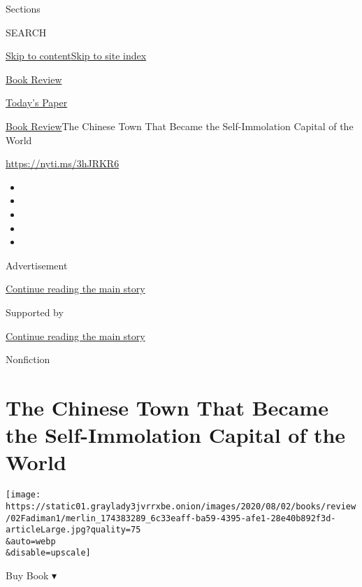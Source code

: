 Sections

SEARCH

\protect\hyperlink{site-content}{Skip to
content}\protect\hyperlink{site-index}{Skip to site index}

\href{https://www.nytimes3xbfgragh.onion/section/books/review}{Book
Review}

\href{https://myaccount.nytimes3xbfgragh.onion/auth/login?response_type=cookie\&client_id=vi}{}

\href{https://www.nytimes3xbfgragh.onion/section/todayspaper}{Today's
Paper}

\href{/section/books/review}{Book Review}\textbar{}The Chinese Town That
Became the Self-Immolation Capital of the World

\href{https://nyti.ms/3hJRKR6}{https://nyti.ms/3hJRKR6}

\begin{itemize}
\item
\item
\item
\item
\item
\end{itemize}

Advertisement

\protect\hyperlink{after-top}{Continue reading the main story}

Supported by

\protect\hyperlink{after-sponsor}{Continue reading the main story}

Nonfiction

\hypertarget{the-chinese-town-that-became-the-self-immolation-capital-of-the-world}{%
\section{The Chinese Town That Became the Self-Immolation Capital of the
World}\label{the-chinese-town-that-became-the-self-immolation-capital-of-the-world}}

\texttt{[image: https://static01.graylady3jvrrxbe.onion/images/2020/08/02/books/review/02Fadiman1/merlin\_174383289\_6c33eaff-ba59-4395-afe1-28e40b892f3d-articleLarge.jpg?quality=75\\\&auto=webp\\\&disable=upscale]}

Buy Book ▾

